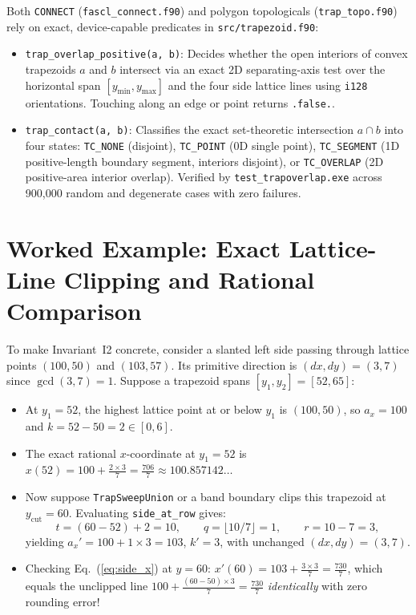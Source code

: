 Both \texttt{CONNECT} (\texttt{fascl\_connect.f90}) and polygon topologicals (\texttt{trap\_topo.f90}) rely on exact, device-capable predicates in \texttt{src/trapezoid.f90}:
\begin{itemize}
  \item \texttt{trap\_overlap\_positive(a, b)}: Decides whether the open interiors of convex trapezoids $a$ and $b$ intersect via an exact 2D separating-axis test over the horizontal span $[y_{\min}, y_{\max}]$ and the four side lattice lines using \texttt{i128} orientations. Touching along an edge or point returns \texttt{.false.}.
  \item \texttt{trap\_contact(a, b)}: Classifies the exact set-theoretic intersection $a \cap b$ into four states: \texttt{TC\_NONE} (disjoint), \texttt{TC\_POINT} (0D single point), \texttt{TC\_SEGMENT} (1D positive-length boundary segment, interiors disjoint), or \texttt{TC\_OVERLAP} (2D positive-area interior overlap). Verified by \texttt{test\_trapoverlap.exe} across 900,000 random and degenerate cases with zero failures.
\end{itemize}

\section{Worked Example: Exact Lattice-Line Clipping and Rational Comparison}

To make Invariant~I2 concrete, consider a slanted left side passing through lattice points $(100, 50)$ and $(103, 57)$. Its primitive direction is $(dx, dy) = (3, 7)$ since $\gcd(3, 7) = 1$. Suppose a trapezoid spans $[y_1, y_2] = [52, 65]$:
\begin{itemize}
  \item At $y_1 = 52$, the highest lattice point at or below $y_1$ is $(100, 50)$, so $a_x = 100$ and $k = 52 - 50 = 2 \in [0, 6]$.
  \item The exact rational $x$-coordinate at $y_1 = 52$ is $x(52) = 100 + \frac{2 \times 3}{7} = \frac{706}{7} \approx 100.857142\dots$
  \item Now suppose \texttt{TrapSweepUnion} or a band boundary clips this trapezoid at $y_{\text{cut}} = 60$. Evaluating \texttt{side\_at\_row} gives:
  \[
    t = (60 - 52) + 2 = 10, \qquad q = \lfloor 10/7 \rfloor = 1, \qquad r = 10 - 7 = 3,
  \]
  yielding $a_x' = 100 + 1 \times 3 = 103$, $k' = 3$, with unchanged $(dx, dy) = (3, 7)$.
  \item Checking Eq.~(\ref{eq:side_x}) at $y = 60$: $x'(60) = 103 + \frac{3 \times 3}{7} = \frac{730}{7}$, which equals the unclipped line $100 + \frac{(60 - 50) \times 3}{7} = \frac{730}{7}$ \emph{identically} with zero rounding error!
\end{itemize}

